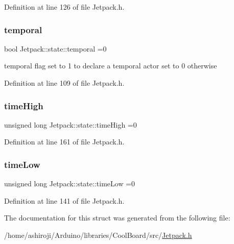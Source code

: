 Definition at line 126 of file Jetpack.\+h.

\mbox{\label{struct_jetpack_1_1state_abd6039e7a48856550b0ffbf8bcff7bdd}} 
\subsubsection{\texorpdfstring{temporal}{temporal}}
{\footnotesize\ttfamily bool Jetpack\+::state\+::temporal =0}

temporal flag set to 1 to declare a temporal actor set to 0 otherwise 

Definition at line 109 of file Jetpack.\+h.

\mbox{\label{struct_jetpack_1_1state_a97c594b20b03b46ae0a6ac544f5d6c8d}} 
\subsubsection{\texorpdfstring{time\+High}{timeHigh}}
{\footnotesize\ttfamily unsigned long Jetpack\+::state\+::time\+High =0}



Definition at line 161 of file Jetpack.\+h.

\mbox{\label{struct_jetpack_1_1state_ae544475d627308218e355a8dbb28ac74}} 
\subsubsection{\texorpdfstring{time\+Low}{timeLow}}
{\footnotesize\ttfamily unsigned long Jetpack\+::state\+::time\+Low =0}



Definition at line 141 of file Jetpack.\+h.



The documentation for this struct was generated from the following file\+:\begin{DoxyCompactItemize}
\item 
/home/ashiroji/\+Arduino/libraries/\+Cool\+Board/src/\hyperlink{_jetpack_8h}{Jetpack.\+h}\end{DoxyCompactItemize}
